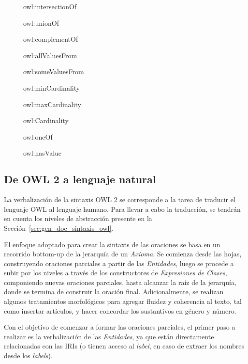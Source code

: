 \begin{figure}
\label{list:constructores_expresiones}
    \begin{itemize}
    \begin{multicols}{2}
        \item owl:intersectionOf
        \item owl:unionOf
        \item owl:complementOf
        \item owl:allValuesFrom
        \item owl:someValuesFrom 
        \item owl:minCardinality
        \item owl:maxCardinality
        \item owl:Cardinality
        \item owl:oneOf
        \item owl:hasValue
        \end{multicols}
    \end{itemize}
\end{figure}

\subsection{De OWL 2 a lenguaje natural}
La verbalización de la sintaxis OWL 2 se corresponde a la tarea de traducir el lenguaje OWL al lenguaje humano. Para llevar a cabo la traducción, se tendrán en cuenta los niveles de abstracción presente en la Sección~\ref{sec:gen_doc_sintaxis_owl}. 

El enfoque adoptado para crear la sintaxis de las oraciones se basa en un recorrido bottom-up de la jerarquía de un \textit{Axioma}. Se comienza desde las hojas, construyendo oraciones parciales a partir de las\textit{ Entidades}, luego se procede a subir por los niveles a través de los constructores de\textit{ Expresiones de Clases}, componiendo nuevas oraciones parciales, hasta alcanzar la raíz de la jerarquía, donde se termina de construir la oración final. Adicionalmente, se realizan algunos tratamientos morfológicos para agregar fluidez y coherencia al texto, tal como insertar artículos, y hacer concordar los sustantivos en género y número.

Con el objetivo de comenzar a formar las oraciones parciales, el primer paso a realizar es la verbalización de las \textit{Entidades}, ya que están directamente relacionadas con las IRIs (o tienen acceso al \emph{label}, en caso de extraer los nombres desde los \emph{labels}).

